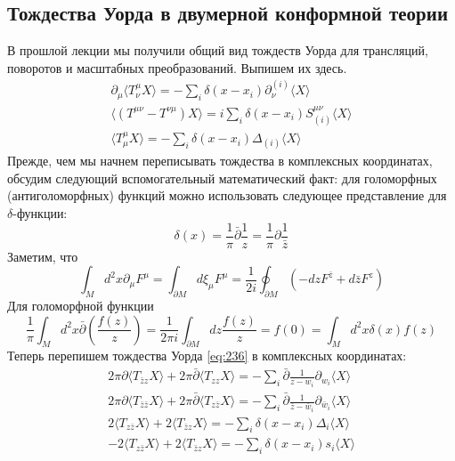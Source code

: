 \documentclass[a4paper,12pt]{article}
\theoremstyle{definition}
\theoremstyle{definition}
\theoremstyle{definition}
\begin{document}
\subsection{Тождества Уорда в двумерной конформной теории}
\label{sec:ward-2d-cft}
В прошлой лекции мы получили общий вид тождеств Уорда для трансляций, поворотов и масштабных преобразований. Выпишем их здесь.
\begin{eqnarray}
  \label{eq:236}
  \partial_{\mu}\langle T^{\mu}_{\nu} X\rangle = -\sum_{i} \delta(x-x_{i}) \partial_{\nu}^{(i)}\langle X\rangle\\
  \langle (T^{\mu\nu}-T^{\nu\mu}) X\rangle =i\sum_{i}\delta(x-x_{i}) S^{\mu\nu}_{(i)}\langle X\rangle\\
  \langle T^{\mu}_{\mu} X\rangle=-\sum_{i}\delta(x-x_{i}) \Delta_{(i)} \langle X\rangle
\end{eqnarray}
Прежде, чем мы начнем переписывать тождества в комплексных координатах, обсудим следующий вспомогательный математический факт: для голоморфных (антиголоморфных) функций можно использовать следующее представление для $\delta$-функции:
\begin{equation}
  \label{eq:237}
  \delta(x)=\frac{1}{\pi} \bar \partial \frac{1}{z} = \frac{1}{\pi}\partial \frac{1}{\bar z}
\end{equation}
Заметим, что
\begin{equation}
  \label{eq:238}
  \int_{M} d^{2}x \partial_{\mu}F^{\mu}=\int_{\partial M} d\xi_{\mu} F^{\mu}=\frac{1}{2i} \oint_{\partial M} (-dz F^{\bar z}+d\bar z F^{z})
\end{equation}
Для голоморфной функции
\begin{equation}
  \label{eq:239}
  \frac{1}{\pi}\int_{M} d^{2}x \bar \partial\left( \frac{f(z)}{z}\right)=\frac{1}{2\pi i} \int_{\partial M} dz \frac{f(z)}{z}=f(0)=\int_{M} d^{2}x \delta(x) f(z)
\end{equation}
Теперь перепишем тождества Уорда \eqref{eq:236} в комплексных координатах:
\begin{eqnarray}
  \label{eq:240}
  2\pi \partial \langle T_{\bar z z } X\rangle +2\pi \bar \partial \langle T_{zz}X\rangle = -\sum_{i} \bar \partial \frac{1}{z-w_{i}} \partial_{w_{i}} \langle X \rangle\\
  2\pi \partial \langle T_{\bar z \bar z } X\rangle +2\pi \bar \partial \langle T_{z\bar z}X\rangle = -\sum_{i} \bar \partial \frac{1}{\bar z-\bar w_{i}} \partial_{\bar w_{i}} \langle X \rangle\\
  2 \langle T_{z\bar z} X\rangle +2 \langle T_{\bar z z }X\rangle =- \sum_{i}\delta(x-x_{i}) \Delta_{i} \langle X\rangle\\
  -2 \langle T_{z\bar z} X\rangle +2 \langle T_{\bar z z }X\rangle =- \sum_{i}\delta(x-x_{i}) s_{i} \langle X\rangle
\end{eqnarray}
\end{document}
